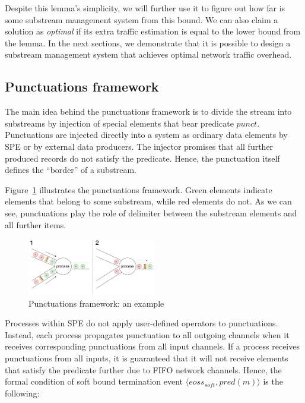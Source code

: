 Despite this lemma's simplicity, we will further use it to figure out how far is some substream management system from this bound. We can also claim a solution as {\em optimal} if its extra traffic estimation is equal to the lower bound from the lemma. In the next sections, we demonstrate that it is possible to design a substream management system that achieves optimal network traffic overhead.

\subsection{Punctuations framework}
\label{fs-acker-punctuations}

The main idea behind the punctuations framework is to divide the stream into substreams by injection of special elements that bear predicate $punct$. Punctuations are injected directly into a system as ordinary data elements by SPE or by external data producers. The injector promises that all further produced records do not satisfy the predicate. Hence, the punctuation itself defines the ``border'' of a substream.

Figure~\ref{punctuations_scheme} illustrates the punctuations framework. Green elements indicate elements that belong to some substream, while red elements do not. As we can see, punctuations play the role of delimiter between the substream elements and all further items.

\begin{figure}[htbp]
  \centering
  \includegraphics[width=0.50\textwidth]{pics/punctuations-scheme.pdf}
  \caption{Punctuations framework: an example}
  \label{punctuations_scheme}
\end{figure}

Processes within SPE do not apply user-defined operators to punctuations. Instead, each process propagates punctuation to all outgoing channels when it receives corresponding punctuations from all input channels. If a process receives punctuations from all inputs, it is guaranteed that it will not receive elements that satisfy the predicate further due to FIFO network channels. Hence, the formal condition of soft bound termination event $\langle eoss_{soft}, pred(m)\rangle$ is the following:


